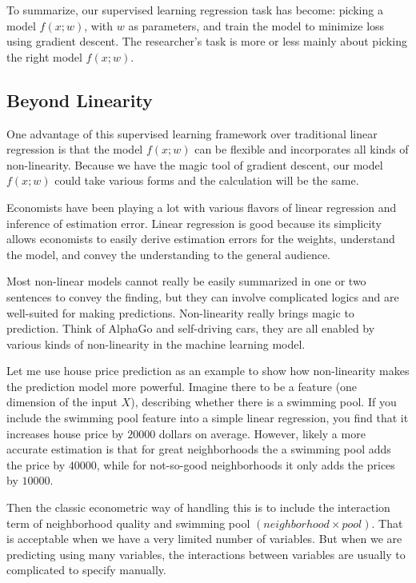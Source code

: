 \documentclass[a4paper]{article}
\begin{document}
To summarize, our supervised learning regression task has become: picking a model $f(x;w)$, with $w$ as parameters, and train the model to minimize loss using gradient descent. The researcher's task is more or less mainly about picking the right model $f(x;w)$.

\subsection{Beyond Linearity}
One advantage of this supervised learning framework over traditional linear regression is that the model $f(x;w)$ can be flexible and incorporates all kinds of non-linearity. Because we have the magic tool of gradient descent, our model $f(x;w)$ could take various forms and the calculation will be the same. 

Economists have been playing a lot with various flavors of linear regression and inference of estimation error. Linear regression is good because its simplicity allows economists to easily derive estimation errors for the weights, understand the model, and convey the understanding to the general audience. 

Most non-linear models cannot really be easily summarized in one or two sentences to convey the finding, but they can involve complicated logics and are well-suited for making predictions. Non-linearity really brings magic to prediction. Think of AlphaGo and self-driving cars, they are all enabled by various kinds of non-linearity in the machine learning model.

Let me use house price prediction as an example to show how non-linearity makes the prediction model more powerful. Imagine there to be a feature (one dimension of the input $X$), describing whether there is a swimming pool. If you include the swimming pool feature into a simple linear regression, you find that it increases house price by $20000$ dollars on average. However, likely a more accurate estimation is that for great neighborhoods the a swimming pool adds the price by $40000$, while for not-so-good neighborhoods it only adds the prices by $10000$. 

Then the classic econometric way of handling this is to include the interaction term of neighborhood quality and swimming pool $(neighborhood \times pool)$. That is acceptable when we have a very limited number of variables. But when we are predicting using many variables, the interactions between variables are usually to complicated to specify manually.
\end{document}
